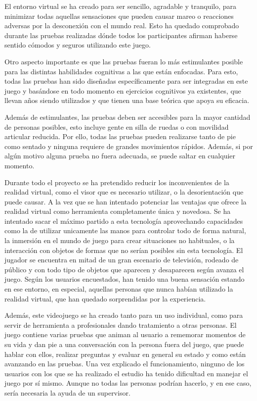 El entorno virtual se ha creado para ser sencillo, agradable y tranquilo, para minimizar todas aquellas sensaciones que pueden causar mareo o reacciones adversas por la desconexión con el mundo real. Esto ha quedado comprobado durante las pruebas realizadas dónde todos los participantes afirman haberse sentido cómodos y seguros utilizando este juego.

Otro aspecto importante es que las pruebas fueran lo más estimulantes posible para las distintas habilidades cognitivas a las que están enfocadas. Para esto, todas las pruebas han sido diseñadas específicamente para ser integradas en este juego y basándose en todo momento en ejercicios cognitivos ya existentes, que llevan años siendo utilizados y que tienen una base teórica que apoya su eficacia.

Además de estimulantes, las pruebas deben ser accesibles para la mayor cantidad de personas posibles, esto incluye gente en silla de ruedas o con movilidad articular reducida. Por ello, todas las pruebas pueden realizarse tanto de pie como sentado y ninguna requiere de grandes movimientos rápidos. Además, si por algún motivo alguna prueba no fuera adecuada, se puede saltar en cualquier momento.

Durante todo el proyecto se ha pretendido reducir los inconvenientes de la realidad virtual, como el visor que es necesario utilizar, o la desorientación que puede causar. A la vez que se han intentado potenciar las ventajas que ofrece la realidad virtual como herramienta completamente única y novedosa. Se ha intentado sacar el máximo partido a esta tecnología aprovechando capacidades como la de utilizar unicamente las manos para controlar todo de forma natural, la inmersión en el mundo de juego para crear situaciones no habituales, o la interacción con objetos de formas que no serían posibles sin esta tecnología. El jugador se encuentra en mitad de un gran escenario de televisión, rodeado de público y con todo tipo de objetos que aparecen y desaparecen según avanza el juego. Según los usuarios encuestados, han tenido una buena sensación estando en ese entorno, en especial, aquellas personas que nunca habían utilizado la realidad virtual, que han quedado sorprendidas por la experiencia.

Además, este videojuego se ha creado tanto para un uso individual, como para servir de herramienta a profesionales dando tratamiento a otras personas. El juego contiene varias pruebas que animan al usuario a rememorar momentos de su vida y dan pie a una conversación con la persona fuera del juego, que puede hablar con ellos, realizar preguntas y evaluar en general su estado y como están avanzando en las pruebas. Una vez explicado el funcionamiento, ninguno de los usuarios con los que se ha realizado el estudio ha tenido dificultad en manejar el juego por sí mismo. Aunque no todas las personas podrían hacerlo, y en ese caso, sería necesaria la ayuda de un supervisor.




